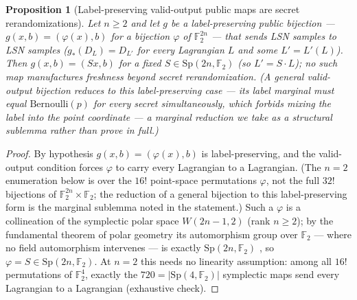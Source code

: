 \documentclass[11pt,a4paper]{article}
\theoremstyle{plain}
\newtheorem{proposition}[theorem]{Proposition}
\theoremstyle{definition}
\newcommand{\F}{\mathbb{F}}
\begin{document}
\begin{proposition}[Label-preserving valid-output public maps are secret rerandomizations]
\label{prop:valid-output}
Let $n\ge 2$ and let $g$ be a \emph{label-preserving} public bijection --- $g(x,b)=(\varphi(x),b)$ for a bijection $\varphi$ of $\F_2^{2n}$ --- that sends LSN samples to LSN samples ($g_*(D_L)=D_{L'}$ for every Lagrangian $L$ and some $L'=L'(L)$). Then $g(x,b)=(Sx,b)$ for a fixed $S\in\mathrm{Sp}(2n,\F_2)$ (so $L'=S\cdot L$); no such map manufactures freshness beyond secret rerandomization. (A general valid-output bijection reduces to this label-preserving case --- its label marginal must equal $\mathrm{Bernoulli}(p)$ for every secret simultaneously, which forbids mixing the label into the point coordinate --- a marginal reduction we take as a structural sublemma rather than prove in full.)
\end{proposition}

\begin{proof}
By hypothesis $g(x,b)=(\varphi(x),b)$ is label-preserving, and the valid-output condition forces $\varphi$ to carry every Lagrangian to a Lagrangian. (The $n=2$ enumeration below is over the $16!$ point-space permutations $\varphi$, not the full $32!$ bijections of $\F_2^{2n}\times\F_2$; the reduction of a general bijection to this label-preserving form is the marginal sublemma noted in the statement.) Such a $\varphi$ is a collineation of the symplectic polar space $W(2n{-}1,2)$ (rank $n\ge 2$); by the fundamental theorem of polar geometry its automorphism group over $\F_2$ --- where no field automorphism intervenes --- is exactly $\mathrm{Sp}(2n,\F_2)$ \cite{Tits74,BCN89}, so $\varphi = S \in \mathrm{Sp}(2n,\F_2)$. At $n=2$ this needs no linearity assumption: among all $16!$ permutations of $\F_2^4$, exactly the $720=|\mathrm{Sp}(4,\F_2)|$ symplectic maps send every Lagrangian to a Lagrangian (exhaustive check).
\end{proof}
\end{document}
